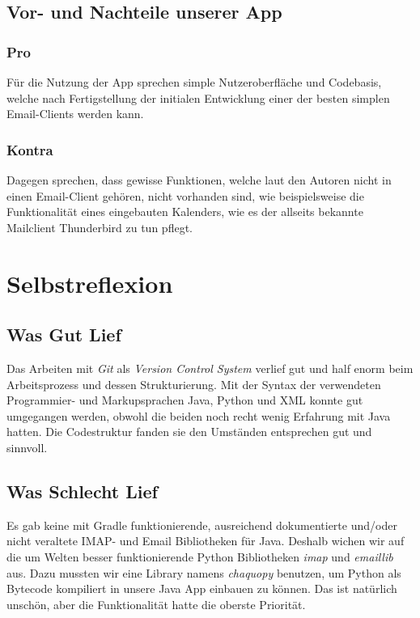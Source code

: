 \documentclass[a4paper,11pt]{article}
\begin{document}
\subsection{Vor- und Nachteile unserer App}
\subsubsection{Pro}
Für die Nutzung der App sprechen simple Nutzeroberfläche und Codebasis, welche nach Fertigstellung der initialen Entwicklung einer der besten simplen Email-Clients werden kann.

\subsubsection{Kontra}
Dagegen sprechen, dass gewisse Funktionen, welche laut den Autoren nicht in einen Email-Client gehören, nicht vorhanden sind, wie beispielsweise die Funktionalität eines eingebauten Kalenders, wie es der allseits bekannte Mailclient Thunderbird zu tun pflegt.\cite{thunderbird}

\section{Selbstreflexion}

\subsection{Was Gut Lief}
Das Arbeiten mit \textit{Git} als \textit{Version Control System} verlief gut und half enorm beim Arbeitsprozess und dessen Strukturierung. Mit der Syntax der verwendeten Programmier- und Markupsprachen Java, Python und XML konnte gut umgegangen werden, obwohl die beiden noch recht wenig Erfahrung mit Java hatten. Die Codestruktur fanden sie den Umständen entsprechen gut und sinnvoll.
\subsection{Was Schlecht Lief}
Es gab keine mit Gradle funktionierende, ausreichend dokumentierte und/oder nicht veraltete IMAP- und Email Bibliotheken für Java. Deshalb wichen wir auf die um Welten besser funktionierende Python Bibliotheken \textit{imap} und \textit{emaillib} aus. Dazu mussten wir eine Library namens \textit{chaquopy} benutzen, um Python als Bytecode kompiliert in unsere Java App einbauen zu können. Das ist natürlich unschön, aber die Funktionalität hatte die oberste Priorität.\\
\end{document}
